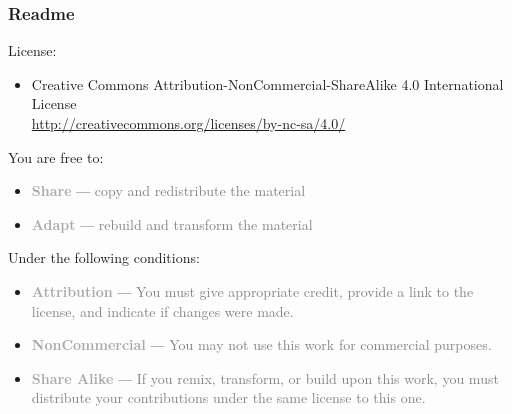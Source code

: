 \documentclass{beamer}\usepackage[]{graphicx}\usepackage[]{color}
\begin{document}
\begin{frame}[fragile]
\frametitle{Readme}

\begin{block}{\scriptsize License:}
\tiny
 \begin{itemize}
  \item[] Creative Commons Attribution-NonCommercial-ShareAlike 4.0 International License \\ 
  \url{http://creativecommons.org/licenses/by-nc-sa/4.0/}{}
 \end{itemize}
\end{block}

\begin{block}{\scriptsize You are free to:}
\tiny
 \begin{itemize}
  \item[] \textcolor{darkgray}{\textbf{Share}} --- \textcolor{gray}{copy and redistribute the material}
  \item[] \textcolor{darkgray}{\textbf{Adapt}} --- \textcolor{gray}{rebuild and transform the material}
 \end{itemize}
\end{block}

\vspace{2mm}
\begin{block}{\scriptsize Under the following conditions:}
\tiny
\begin{itemize}
 \item[] \textcolor{darkgray}{\textbf{Attribution}} --- \textcolor{gray}{You must give appropriate credit, provide a link to the license, and indicate if changes were made.}
 \item[] \textcolor{darkgray}{\textbf{NonCommercial}} --- \textcolor{gray}{You may not use this work for commercial purposes.}
 \item[] \textcolor{darkgray}{\textbf{Share Alike}} --- \textcolor{gray}{If you remix, transform, or build upon this 
 work, you must distribute your contributions under the same license to this one.}
\end{itemize}
\end{block}

\end{frame}

\end{document}
